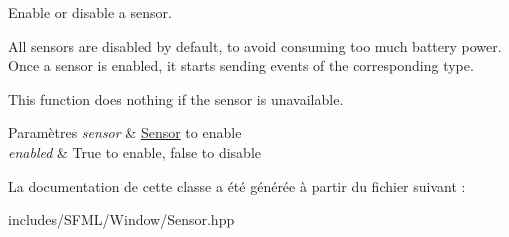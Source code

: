 Enable or disable a sensor. 

All sensors are disabled by default, to avoid consuming too much battery power. Once a sensor is enabled, it starts sending events of the corresponding type.

This function does nothing if the sensor is unavailable.


\begin{DoxyParams}{Paramètres}
{\em sensor} & \hyperlink{classsf_1_1Sensor}{Sensor} to enable \\
\hline
{\em enabled} & True to enable, false to disable \\
\hline
\end{DoxyParams}


La documentation de cette classe a été générée à partir du fichier suivant \+:\begin{DoxyCompactItemize}
\item 
includes/\+S\+F\+M\+L/\+Window/Sensor.\+hpp\end{DoxyCompactItemize}
